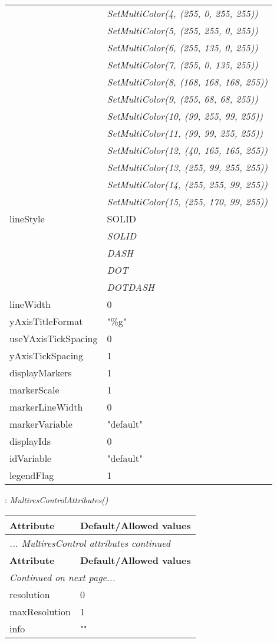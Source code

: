 \documentclass[10pt,a4paper]{report}
\begin{document}
\begin{longtable}{lp{7.5cm}}
 & {\it  SetMultiColor(4, (255, 0, 255, 255))} \\
 & {\it  SetMultiColor(5, (255, 255, 0, 255))} \\
 & {\it  SetMultiColor(6, (255, 135, 0, 255))} \\
 & {\it  SetMultiColor(7, (255, 0, 135, 255))} \\
 & {\it  SetMultiColor(8, (168, 168, 168, 255))} \\
 & {\it  SetMultiColor(9, (255, 68, 68, 255))} \\
 & {\it  SetMultiColor(10, (99, 255, 99, 255))} \\
 & {\it  SetMultiColor(11, (99, 99, 255, 255))} \\
 & {\it  SetMultiColor(12, (40, 165, 165, 255))} \\
 & {\it  SetMultiColor(13, (255, 99, 255, 255))} \\
 & {\it  SetMultiColor(14, (255, 255, 99, 255))} \\
 & {\it  SetMultiColor(15, (255, 170, 99, 255))} \\
lineStyle  &  SOLID   \\
 & {\it  SOLID} \\
 & {\it  DASH} \\
 & {\it  DOT} \\
 & {\it  DOTDASH} \\
lineWidth  &  0 \\
yAxisTitleFormat  &  "\%g" \\
useYAxisTickSpacing  &  0 \\
yAxisTickSpacing  &  1 \\
displayMarkers  &  1 \\
markerScale  &  1 \\
markerLineWidth  &  0 \\
markerVariable  &  "default" \\
displayIds  &  0 \\
idVariable  &  "default" \\
legendFlag  &  1 \\
\end{longtable}

\newpage

{}
: {\it MultiresControlAttributes() }\\[-3mm]

\begin{longtable}{ll}
{\bf Attribute} & {\bf Default/Allowed values} \\
\hline \hline
\endfirsthead
\multicolumn{2}{l}{{\it ... MultiresControl attributes continued}} \\
{\bf Attribute} & {\bf Default/Allowed values} \\
\hline \hline
\endhead
\hline
\multicolumn{2}{l}{{\it Continued on next page...}} \\
\endfoot
\hline
\endlastfoot

resolution  &  0 \\
maxResolution  &  1 \\
info  &  "" \\
\end{longtable}
\end{document}
